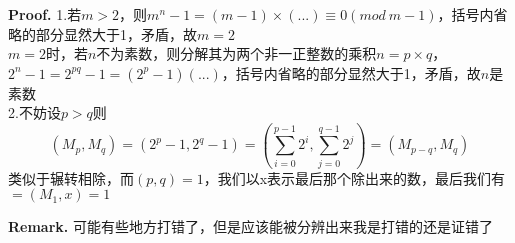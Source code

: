 \documentclass[12pt, a4paper, oneside]{ctexart}
\newenvironment{solution}{\par\noindent\textbf{Proof. }}{\par}
\newenvironment{remark}{\noindent \textbf{Remark.}}{}
\begin{document}
	\begin{solution}
		1.若$m > 2$，则$ m^n - 1 = \left( m-1 \right) \times \left(...\right) \equiv 0\left(mod~m-1\right) $，括号内省略的部分显然大于1，矛盾，故$m=2$ \\
		$m=2$时，若$n$不为素数，则分解其为两个非一正整数的乘积$n = p \times q$，$ 2^n-1 = 2^{pq} - 1 = \left(2^p - 1\right) \left(...\right) $，括号内省略的部分显然大于1，矛盾，故$ n $是素数 \\
		2.不妨设$ p>q $则$$ \left( M_p,M_q \right) = \left( 2^p-1,2^q-1 \right) = \left( \sum_{i=0}^{p-1}2^i, \sum_{j=0}^{q-1}2^j \right) = \left( M_{p-q},M_q \right)$$
		类似于辗转相除，而$\left(p,q\right) = 1$，我们以x表示最后那个除出来的数，最后我们有$ = \left(M_1,x\right) = 1$
	\end{solution}
	
	\begin{remark}
		可能有些地方打错了，但是应该能被分辨出来我是打错的还是证错了
	\end{remark}
	
\end{document}
